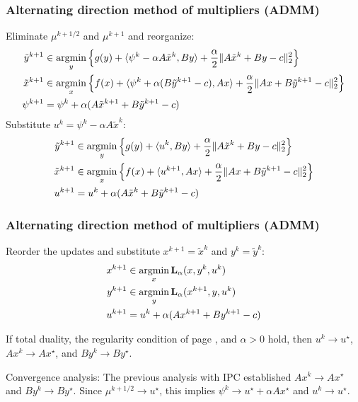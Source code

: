 \documentclass[10pt,mathserif]{beamer}
\begin{document}
\begin{frame}
\frametitle{Alternating direction method of multipliers (ADMM)}
Eliminate $\mu^{k+1/2}$ and $\mu^{k+1}$ and reorganize:
\begin{align*}
\tilde{y}^{k+1}&\in\operatorname*{argmin}_y\left\{g(y)+\langle \psi^k-\alpha A\tilde{x}^k,By\rangle +\frac{\alpha}{2}\|A\tilde{x}^k+By-c\|_2^2\right\}\nonumber\\
\tilde{x}^{k+1}&\in\operatorname*{argmin}_x\left\{f(x)+\langle \psi^k+\alpha( B\tilde{y}^{k+1}-c),Ax\rangle+\frac{\alpha}{2}\|Ax+B\tilde{y}^{k+1}-c\|_2^2\right\}\nonumber\\
\psi^{k+1}&=\psi^k+\alpha(A\tilde{x}^{k+1}+B\tilde{y}^{k+1}-c)
\end{align*}
Substitute $ u ^k=\psi^k-\alpha A\tilde{x}^k$:
\begin{align*}
\tilde{y}^{k+1}&\in\operatorname*{argmin}_y\left\{g(y)
+\langle u ^k,By\rangle
+\frac{\alpha}{2}\|A\tilde{x}^k+By-c\|_2^2\right\}\\
\tilde{x}^{k+1}&\in\operatorname*{argmin}_x\left\{f(x)
+\langle u ^{k+1},Ax\rangle
+\frac{\alpha}{2}\|Ax+B\tilde{y}^{k+1}-c\|_2^2\right\}\\
 u ^{k+1}&= u ^k+\alpha(A\tilde{x}^{k}+B\tilde{y}^{k+1}-c)
\end{align*}
\end{frame}


\begin{frame}
\frametitle{Alternating direction method of multipliers (ADMM)}
Reorder the updates and substitute $x^{k+1}=\tilde{x}^k$ and $y^k=\tilde{y}^k$:
\begin{align*}
x^{k+1}&\in
 \operatorname*{argmin}_{x} \mathbf{L}_\alpha(x,y^k, u ^k)\\
 y^{k+1}&\in
 \operatorname*{argmin}_{y} \mathbf{L}_\alpha(x^{k+1},y, u ^k)\\
 u ^{k+1}&= u ^k+\alpha(Ax^{k+1}+By^{k+1}-c)
\end{align*}

\vspace{0.2in}
If total duality, the regularity condition of page \pageref{frame_admm_first}, and $\alpha>0$ hold, then $ u ^k\rightarrow  u ^\star$, $Ax^k\rightarrow Ax^\star$, and $By^k\rightarrow By^\star$.

\vspace{0.2in}
Convergence analysis: The previous analysis with IPC established $Ax^k\rightarrow Ax^\star$ and $By^k\rightarrow By^\star$.
Since $\mu^{k+1/2}\rightarrow  u ^\star$, this implies $\psi^k\rightarrow  u ^\star+\alpha Ax^\star$ and $ u ^k\rightarrow  u ^\star$.
\end{frame}
\end{document}
